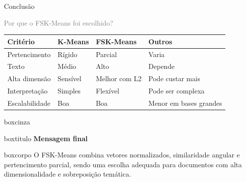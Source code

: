 \documentclass[aspectratio=43]{beamer}
\begin{document}
\begin{frame}[t]{Conclusão}

\textcolor{gray}{\large Por que o FSK-Means foi escolhido?}

\vspace{0.2cm}

\scriptsize
\renewcommand{\arraystretch}{1.18}
\begin{center}
\begin{tabular}{P{2.1cm} P{2.0cm} P{2.2cm} P{2.5cm}}
\toprule
\textbf{Critério} & \textbf{K-Means} & \textbf{FSK-Means} & \textbf{Outros} \\
\midrule
Pertencimento & Rígido & Parcial & Varia \\
Texto & Médio & Alto & Depende \\
Alta dimensão & Sensível & Melhor com L2 & Pode custar mais \\
Interpretação & Simples & Flexível & Pode ser complexa \\
Escalabilidade & Boa & Boa & Menor em bases grandes \\
\bottomrule
\end{tabular}
\end{center}

\vspace{0.25cm}

\begin{center}
\begin{beamercolorbox}[wd=0.82\paperwidth, sep=0pt]{boxcinza}
  \begin{beamercolorbox}[wd=0.82\paperwidth, ht=0.42cm, dp=0.08cm, leftskip=0.2cm]{boxtitulo}
    {\color{uelgreen}\scriptsize\textbf{Mensagem final}}
  \end{beamercolorbox}
  \begin{beamercolorbox}[wd=0.82\paperwidth, sep=0.2cm]{boxcorpo}
    \scriptsize
    O FSK-Means combina vetores normalizados, similaridade angular e pertencimento parcial, sendo uma escolha adequada para documentos com alta dimensionalidade e sobreposição temática.
  \end{beamercolorbox}
\end{beamercolorbox}
\end{center}

\end{frame}
\end{document}
